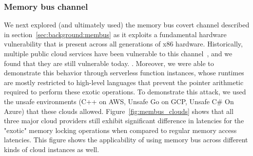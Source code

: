 
\subsubsection{Memory bus channel}
We next explored (and ultimately used) the memory bus covert channel described
in section~\ref{sec:background:membus} as it exploits a fundamental hardware
vulnerability that is present across all generations of x86 hardware.
Historically, multiple public cloud services have been vulnerable to this
channel~\cite{varad191016,compstudycoresidency}, and we found that they are
still vulnerable today. .
Moreover, we were able to demonstrate this behavior through serverless function
instances, whose runtimes are mostly restricted to high-level languages that
prevent the pointer arithmetic required to perform these exotic operations.  To
demonstrate this attack, we used the unsafe environments (C++ on AWS, Unsafe Go
on GCP, Unsafe C\# On Azure) that these clouds allowed. 
Figure~\ref{fig:membus_clouds} shows that all three major cloud providers still
exhibit significant difference in latencies for the "exotic" memory locking
operations when compared to regular memory access latencies. This figure shows
the applicability of using memory bus across different kinds of cloud instances
as well.


